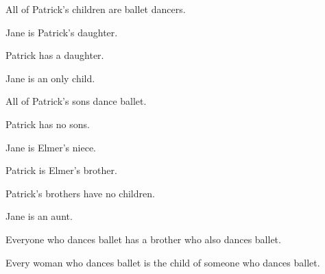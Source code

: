 \begin{earg}
\item All of Patrick's children are ballet dancers.
\item[] 
\item Jane is Patrick's daughter.
\item[] 
\item Patrick has a daughter.
\item[] 
\item Jane is an only child.
\item[] 
\item All of Patrick's sons dance ballet.
\item[] 
\item Patrick has no sons.
\item[] 
\item Jane is Elmer's niece.
\item[] 
\item Patrick is Elmer's brother.
\item[] 
\item Patrick's brothers have no children.
\item[] 
\item Jane is an aunt.
\item[] 
\item Everyone who dances ballet has a brother who also dances ballet.
\item[] 
\item Every woman who dances ballet is the child of someone who dances ballet.
\item[] 
\end{earg}



